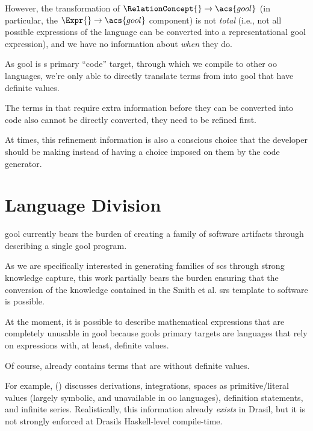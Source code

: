 However, the transformation of \(\RelationConcept{} \rightarrow \acs{gool}\) (in
particular, the \(\Expr{} \rightarrow \acs{gool}\) component) is not
\textit{total} (i.e., not all possible expressions of the \Expr{} language can
be converted into a representational \acs{gool} expression), and we have no
information about \textit{when} they do.

As \acs{gool} is \Expr{}s primary ``code'' target, through which we compile to
other \acs{oo} languages, we're only able to directly translate terms from
\Expr{} into \acs{gool} that have definite values.

The terms in \Expr{} that require extra information before they can be converted
into code also cannot be directly converted, they need to be refined first.

At times, this refinement information is also a conscious choice that the
developer should be making instead of having a choice imposed on them by the
code generator.












\section{Language Division}

\acs{gool} currently bears the burden of creating a family of software artifacts
through describing a single \acs{gool} program.

As we are specifically interested in generating families of \acs{scs} through
strong knowledge capture, this work partially bears the burden ensuring that the
conversion of the knowledge contained in the Smith et al. \acs{srs} template
\cite{SmithAndLai2005} to software is possible.

At the moment, it is possible to describe mathematical expressions that are
completely unusable in \acs{gool} because \acsp{gool} primary targets are
languages that rely on expressions with, at least, definite values.

Of course, \Expr{} already contains terms that are without definite values.

For example, \Expr{} () discusses derivations,
integrations, spaces as primitive/literal values (largely symbolic, and
unavailable in \acs{oo} languages), definition statements, and infinite series.
Realistically, this information already \textit{exists} in Drasil, but it is not
strongly enforced at Drasils Haskell-level compile-time.

